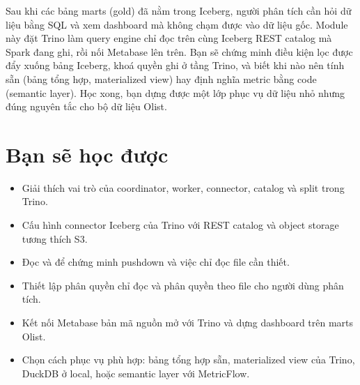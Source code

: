 
Sau khi các bảng marts (gold) đã nằm trong Iceberg, người phân tích cần hỏi dữ liệu bằng SQL và xem dashboard mà không chạm được vào dữ liệu gốc. Module này đặt Trino làm query engine chỉ đọc trên cùng Iceberg REST catalog mà Spark đang ghi, rồi nối Metabase lên trên. Bạn sẽ chứng minh điều kiện lọc được đẩy xuống bảng Iceberg, khoá quyền ghi ở tầng Trino, và biết khi nào nên tính sẵn (bảng tổng hợp, materialized view) hay định nghĩa metric bằng code (semantic layer). Học xong, bạn dựng được một lớp phục vụ dữ liệu nhỏ nhưng đúng nguyên tắc cho bộ dữ liệu Olist.

\section{Bạn sẽ học được}
\begin{itemize}
  \item Giải thích vai trò của coordinator, worker, connector, catalog và split trong Trino.
  \item Cấu hình connector Iceberg của Trino với REST catalog và object storage tương thích S3.
  \item Đọc  và  để chứng minh pushdown và việc chỉ đọc file cần thiết.
  \item Thiết lập phân quyền chỉ đọc và phân quyền theo file cho người dùng phân tích.
  \item Kết nối Metabase bản mã nguồn mở với Trino và dựng dashboard trên marts Olist.
  \item Chọn cách phục vụ phù hợp: bảng tổng hợp sẵn, materialized view của Trino, DuckDB ở local, hoặc semantic layer với MetricFlow.
\end{itemize}

